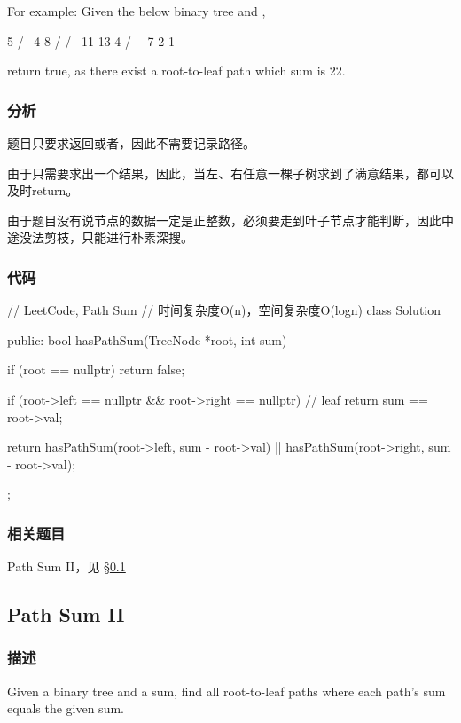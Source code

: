 For example:
Given the below binary tree and ,
\begin{Code}
          5
         / \
        4   8
       /   / \
      11  13  4
     /  \      \
    7    2      1
\end{Code}
return true, as there exist a root-to-leaf path  which sum is 22.


\subsubsection{分析}
题目只要求返回或者，因此不需要记录路径。

由于只需要求出一个结果，因此，当左、右任意一棵子树求到了满意结果，都可以及时return。

由于题目没有说节点的数据一定是正整数，必须要走到叶子节点才能判断，因此中途没法剪枝，只能进行朴素深搜。

\subsubsection{代码}

\begin{Code}
// LeetCode, Path Sum
// 时间复杂度O(n)，空间复杂度O(logn)
class Solution {
public:
    bool hasPathSum(TreeNode *root, int sum) {
        if (root == nullptr) return false;

        if (root->left == nullptr && root->right == nullptr) // leaf
            return sum == root->val;

        return hasPathSum(root->left, sum - root->val)
                || hasPathSum(root->right, sum - root->val);
    }
};
\end{Code}


\subsubsection{相关题目}
\begindot
\item Path Sum II，见 \S \ref{sec:path-sum-ii}
\myenddot


\subsection{Path Sum II}
\label{sec:path-sum-ii}


\subsubsection{描述}
Given a binary tree and a sum, find all root-to-leaf paths where each path's sum equals the given sum.

